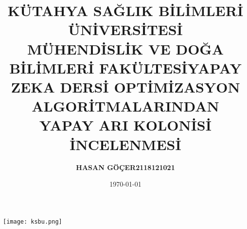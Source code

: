 \documentclass[12pt,a4paper]{article}
\title{\bf\fontsize{12pt}{14pt}\selectfont KÜTAHYA SAĞLIK BİLİMLERİ ÜNİVERSİTESİ \\ MÜHENDİSLİK VE DOĞA BİLİMLERİ FAKÜLTESİ}
\date{}
\begin{document}
	
	\maketitle

	\begin{center}
			\texttt{[image: ksbu.png]}
	\end{center}

	
	\begin{center}
		\vspace{1cm} 
	\end{center}
	\begin{center}
	\title{\bf\fontsize{12pt}{14pt}\selectfont YAPAY ZEKA DERSİ }
	\end{center}
		\begin{center}
		\title{\bf\fontsize{12pt}{14pt}\selectfont OPTİMİZASYON ALGORİTMALARINDAN YAPAY ARI KOLONİSİ İNCELENMESİ}
	\end{center}
	\begin{center}
	\vspace{1cm} 
	\end{center}
	\begin{center}
		
	\author{\bf\fontsize{12pt}{14pt}HASAN GÖÇER\hspace{1.5cm}2118121021}
	
	\begin{center}
	\vspace{1cm} 
	\end{center}
	\date{\today} 
	\end{center}
  
\end{document}
